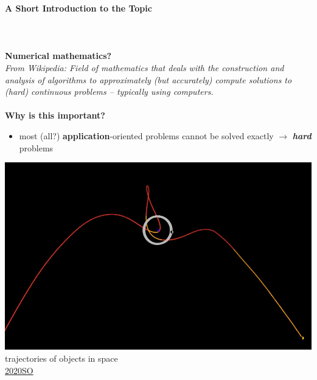 


\begin{frame}[c]
	\textbf{\large A Short Introduction to the Topic}\\
	~\\
	~\\~\\
	\textbf{Numerical mathematics?}\\
	\textit{From Wikipedia: Field of mathematics that deals with the construction and analysis of algorithms to approximately (but accurately) compute solutions to (hard) continuous problems -- typically using computers.}
	~\\~\\
	\textbf{Why is this important?}~\\
	\begin{itemize}
		\item most (all?) \textbf{application}-oriented problems cannot be solved exactly $\rightarrow$ \textit{\textbf{hard}} problems \vspace{0.3cm}
	\end{itemize}
	\begin{minipage}[t]{0.25\textwidth}\centering
		\includegraphics[width=\textwidth]{media/trajectories_2020SO.jpg}\\
		trajectories of objects in space \\
		\hyperref{https://en.wikipedia.org/wiki/2020_SO\#/media/File:2020SO_b.gif}{}{}{2020SO} 

\end{minipage}
\end{frame}

